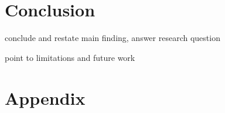 \documentclass[
10pt, %
a4paper, %
oneside, %
headinclude,footinclude, %
] {book}%
\begin{document}
\chapter{Conclusion}
\label{conclusion}

conclude and restate main finding, answer research question

point to limitations and future work





 



\newpage
\appendix
\chapter{Appendix}
\end{document}
